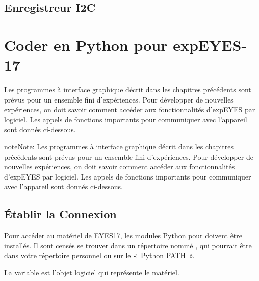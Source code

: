 \documentclass[a4paper,12pt,french]{sphinxmanual}
\begin{document}
\section{Enregistreur I2C}
\label{\detokenize{8.4:enregistreur-i2c}}\label{\detokenize{8.4::doc}}

\chapter{Coder en Python pour expEYES-17}
\label{\detokenize{index:coder-en-python-pour-expeyes-17}}
Les programmes à interface graphique décrit dans les chapitres
précédents sont prévus pour un ensemble fini d’expériences. Pour
développer de nouvelles expériences, on doit savoir comment accéder
aux fonctionnalités d’expEYES par logiciel. Les appels de fonctions
importants pour communiquer avec l’appareil sont donnés ci-dessous.

\begin{sphinxadmonition}{note}{Note:}
Les programmes à interface graphique décrit dans les chapitres
précédents sont prévus pour un ensemble fini d’expériences. Pour
développer de nouvelles expériences, on doit savoir comment accéder
aux fonctionnalités d’expEYES par logiciel. Les appels de fonctions
importants pour communiquer avec l’appareil sont donnés ci-dessous.
\end{sphinxadmonition}


\section{Établir la Connexion}
\label{\detokenize{9.0:etablir-la-connexion}}\label{\detokenize{9.0::doc}}
Pour accéder au matériel de EYES17, les modules Python pour 
doivent être installés. Il sont censés se trouver dans un répertoire
nommé , qui pourrait être dans votre répertoire personnel
ou sur le « Python PATH ».


\begin{sphinxVerbatim}[commandchars=\\\{\}]
 
  
\end{sphinxVerbatim}

La variable  est l’objet logiciel qui représente le matériel.
\end{document}
